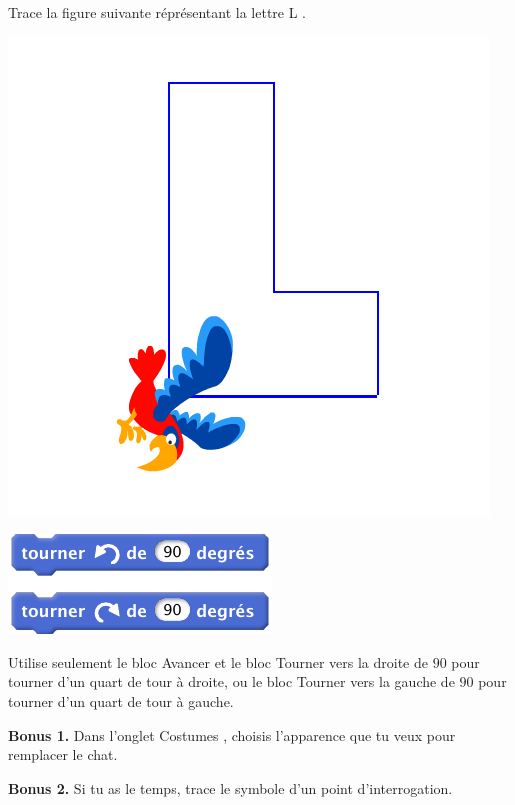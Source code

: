 \documentclass[class=report,crop=false, 12pt]{standalone}
\begin{document}
\begin{activite}

Trace la figure suivante réprésentant la lettre \og L \fg{}.

\begin{center}
\begin{minipage}{0.3\textwidth}
\includegraphics[width=\textwidth]{ecran-01-ex3}
\end{minipage}
\begin{minipage}{0.3\textwidth}
\end{minipage}
\begin{minipage}{0.3\textwidth}
  \includegraphics[scale=\scalebloc]{bloc-01-ex3}
\end{minipage}  
\end{center} 

Utilise seulement le bloc \og Avancer \fg{} et le bloc \og Tourner vers la droite de $90$\textdegree \fg{} pour tourner d'un quart de tour à droite, ou le bloc \og Tourner vers la gauche de $90$\textdegree \fg{} pour tourner d'un quart de tour à  gauche.

\bigskip

\textbf{Bonus 1.} Dans l'onglet \og Costumes \fg{}, choisis l'apparence que tu veux pour remplacer le chat.

\textbf{Bonus 2.} Si tu as le temps, trace le symbole d'un point d'interrogation.



\end{activite}
\end{document}
